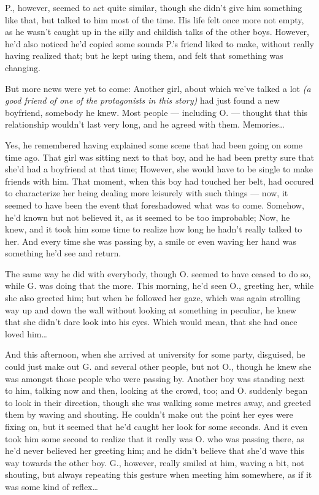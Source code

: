 P., however, seemed to act quite similar, though she didn't give him something like that, but talked to him most of the time. 
His life felt once more not empty, as he wasn't caught up in the silly and childish talks of the other boys. However, he'd also noticed he'd copied some sounds P.'s friend liked to make, without really having realized that; but he kept using them, and felt that something was changing.

But more news were yet to come: Another girl, about which we've talked a lot \emph{(a good friend of one of the protagonists in this story)} had just found a new boyfriend, somebody he knew. Most people --- including O. --- thought that this relationship wouldn't last very long, and he agreed with them. 
Memories\ldots

Yes, he remembered having explained some scene that had been going on some time ago. That girl was sitting next to that boy, and he had been pretty sure that she'd had a boyfriend at that time; However, she would have to be single to make friends with him. That moment, when this boy had touched her belt, had occured to characterize her being dealing more leisurely with such things --- now, it seemed to have been the event that foreshadowed what was to come. Somehow, he'd known but not believed it, as it seemed to be too improbable; Now, he knew, and it took him some time to realize how long he hadn't really talked to her. And  every time she was passing by, a smile or even waving her hand was something he'd see and return.

The same way he did with everybody, though O. seemed to have ceased to do so, while G. was doing that the more. 
This morning, he'd seen O., greeting her, while she also greeted him; but when he followed her gaze, which was again strolling way up and down the wall without looking at something in peculiar, he knew that she didn't dare look into his eyes. Which would mean, that she had once loved him\ldots

And this afternoon, when she arrived at university for some party, disguised, he could just make out G. and several other people, but not O., though he knew she was amongst those people who were passing by. Another boy was standing next to him, talking now and then, looking at the crowd, too; and O. suddenly began to look in their direction, though she was walking some metres away, and greeted them by waving and shouting. He couldn't make out the point her eyes were fixing on, but it seemed that he'd caught her look for some seconds. And it even took him some second to realize that it really was O. who was passing there, as he'd never believed her greeting him; and he didn't believe that she'd wave this way towards the other boy. G., however, really smiled at him, waving a bit, not shouting, but always repeating this gesture when meeting him somewhere, as if it was some kind of reflex\ldots

